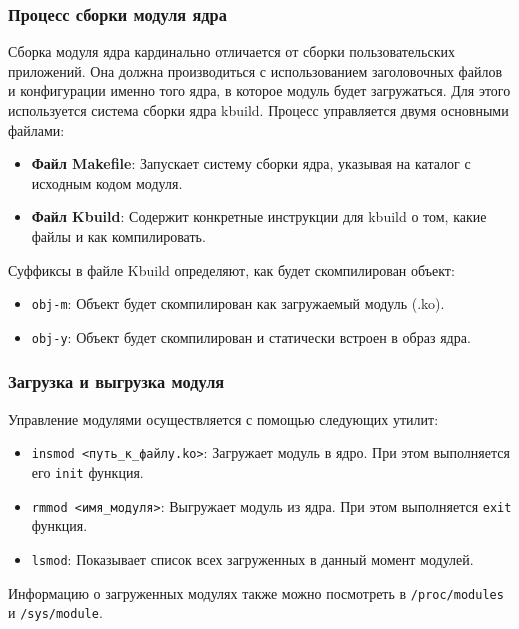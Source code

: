\subsubsection{Процесс сборки модуля ядра}
Сборка модуля ядра кардинально отличается от сборки пользовательских приложений.
Она должна производиться с использованием заголовочных файлов и конфигурации именно того ядра, в которое модуль будет загружаться.
Для этого используется система сборки ядра kbuild. Процесс управляется двумя основными файлами:

\begin{itemize}
    \item \textbf{Файл Makefile}: Запускает систему сборки ядра, указывая на каталог с исходным кодом модуля.
    
    \item \textbf{Файл Kbuild}: Содержит конкретные инструкции для kbuild о том, какие файлы и как компилировать.
    
\end{itemize}

Суффиксы в файле Kbuild определяют, как будет скомпилирован объект:
\begin{itemize}
    \item \texttt{obj-m}: Объект будет скомпилирован как загружаемый модуль (.ko).
    \item \texttt{obj-y}: Объект будет скомпилирован и статически встроен в образ ядра.
\end{itemize}

\subsubsection{Загрузка и выгрузка модуля}
Управление модулями осуществляется с помощью следующих утилит:
\begin{itemize}
    \item \texttt{insmod <путь_к_файлу.ko>}: Загружает модуль в ядро. При этом выполняется его \texttt{init} функция.
    \item \texttt{rmmod <имя_модуля>}: Выгружает модуль из ядра. При этом выполняется \texttt{exit} функция.
    \item \texttt{lsmod}: Показывает список всех загруженных в данный момент модулей.
\end{itemize}

Информацию о загруженных модулях также можно посмотреть в \texttt{/proc/modules} и \texttt{/sys/module}.

